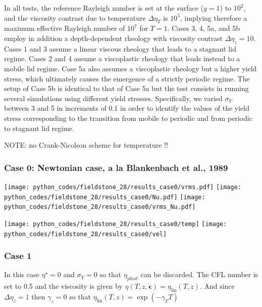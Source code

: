 In all tests, the reference Rayleigh number is set at the surface ($y=1$) to $10^2$, and the viscosity contrast due to temperature $\Delta\eta_T$ is $10^5$, implying therefore a maximum effective Rayleigh number of $10^7$ for $T=1$. Cases 3, 4, 5a, and 5b employ in addition a depth-dependent rheology with viscosity contrast  $\Delta\eta_z=10$. Cases 1 and 3 assume a linear viscous rheology that leads to a stagnant lid regime. Cases 2 and 4 assume a viscoplastic rheology that leads instead to a mobile lid regime. Case 5a also assumes a viscoplastic rheology but a higher yield stress, which ultimately causes the emergence of a strictly periodic regime. The setup of Case 5b is identical to that of Case 5a but the test consists in running several simulations using different yield stresses. Specifically, we varied $\sigma_Y$ between 3 and 5 in increments of 0.1 in order to identify the values of the yield stress corresponding to the transition from mobile to periodic and from periodic to stagnant lid regime. 

NOTE: no Crank-Nicolson scheme for temperature !!

\subsubsection*{Case 0: Newtonian case, a la Blankenbach et al., 1989}

\texttt{[image: python\_codes/fieldstone\_28/results\_case0/vrms.pdf]}
\texttt{[image: python\_codes/fieldstone\_28/results\_case0/Nu.pdf]}
\texttt{[image: python\_codes/fieldstone\_28/results\_case0/vrms\_Nu.pdf]}

\texttt{[image: python\_codes/fieldstone\_28/results\_case0/temp]}
\texttt{[image: python\_codes/fieldstone\_28/results\_case0/vel]}



\newpage %
\subsubsection*{Case 1}

In this case $\eta^\star=0$ and $\sigma_Y=0$ so that $\eta_{plast}$ can be discarded.
The CFL number is set to 0.5 and the viscosity is given by 
$\eta(T,z,\dot{\boldsymbol{\epsilon}}) =   \eta_\text{lin}(T,z) $.
And since $\Delta \eta_z=1$ then $\gamma_z=0$ so that
$\eta_\text{lin} (T,z) = \exp(-\gamma_T T )$

